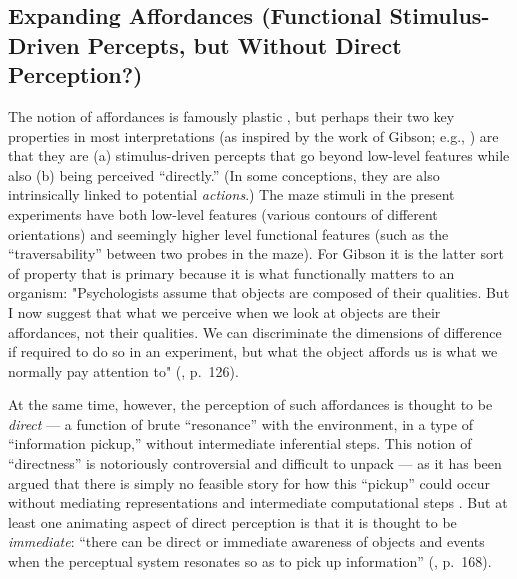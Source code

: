 \subsection[Expanding Affordances]{Expanding Affordances (Functional Stimulus-Driven Percepts, but Without Direct Perception?)}
The notion of affordances is famously plastic \parencite{chong_evolution_2020}, but perhaps their two key properties in most interpretations (as inspired by the work of Gibson; e.g., \cite{gibson_ecological_1979}) are that they are (a) stimulus-driven percepts that go beyond low-level features while also (b) being perceived “directly.” (In some conceptions, they are also intrinsically linked to potential \textit{actions}.) The maze stimuli in the present experiments have both low-level features (various contours of different orientations) and seemingly higher level functional features (such as the “traversability” between two probes in the maze). For Gibson it is the latter sort of property that is primary because it is what functionally matters to an organism: "Psychologists assume that objects are composed of their qualities. But I now suggest that what we perceive when we look at objects are their affordances, not their qualities. We can discriminate the dimensions of difference if required to do so in an experiment, but what the object affords us is what we normally pay attention to" (\cite{gibson_ecological_1979}, p.~126).

At the same time, however, the perception of such affordances is thought to be \textit{direct} --- a function of brute “resonance” with the environment, in a type of “information pickup,” without intermediate inferential steps. This notion of “directness” is notoriously controversial and difficult to unpack --- as it has been argued that there is simply no feasible story for how this “pickup” could occur without mediating representations and intermediate computational steps \parencite{fodor_how_1981, ullman_against_1980}. But at least one animating aspect of direct perception is that it is thought to be \textit{immediate}: “there can be direct or immediate awareness of objects and events when the perceptual system resonates so as to pick up information” (\cite{gibson_ecological_1979}, p.~168).

